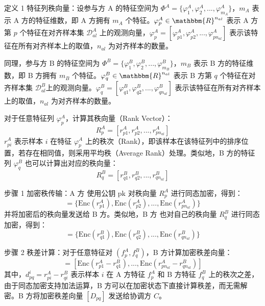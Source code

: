 定义 1 特征列秩向量：设参与方 A 的特征空间为 $ \Phi^A = \{\varphi^A_1, \varphi^A_2, ..., \varphi^A_{m_A}\} $，$ m_A $ 表示 A 方的特征维数，即 A 方拥有 $ m_A $ 个特征。$ \varphi^A_p \in \mathbbm{R}^{n_{al}} $ 表示 A 方第 $ p $ 个特征在对齐样本集 $ \mathcal{D}^A_{al} $ 上的观测向量，$ \varphi^A_p = [\varphi^A_{p1}, \varphi^A_{p2}, ..., \varphi^A_{pn_{al}}] $ 表示该特征在所有对齐样本上的取值，$ n_{al} $ 为对齐样本的数量。

同理，参与方 B 的特征空间为 $ \Phi^B = \{\varphi^B_1, \varphi^B_2, ..., \varphi^B_{m_B}\} $，$ m_B $ 表示 B 方的特征维数，即 B 方拥有 $ m_B $ 个特征。$ \varphi^B_q \in \mathbbm{R}^{n_{al}} $ 表示 B 方第 $ q $ 个特征在对齐样本集 $ \mathcal{D}^B_{al} $上的观测向量。$ \varphi^B_q = [\varphi^B_{q1}, \varphi^B_{q2}, ..., \varphi^B_{qn_{al}}] $ 表示该特征在所有对齐样本上的取值，$ n_{al} $ 为对齐样本的数量。

对于任意特征列 $ \varphi^A_p $，计算其秩向量（Rank Vector）：
\begin{equation}
	R^A_p = [r^A_{p1}, r^A_{p2}, ..., r^A_{pn_{al}}]
\end{equation}
$ r^A_{pi} $ 表示样本 $ i $ 在特征 $ \varphi^A_p $ 上的秩次（Rank），即该样本在该特征列中的排序位置，若存在相同值，则采用平均秩（Average Rank）处理。类似地，B 方的特征列 $ \varphi^B_q $ 也可以计算出对应的秩向量：
\begin{equation}
	R^B_q = [r^B_{q1}, r^B_{q2}, ..., r^B_{qn_{al}}]
\end{equation}

步骤 1 加密秩传输：A 方 使用公钥 $ \text{pk} $ 对秩向量 $ R^A_p $ 进行同态加密，得到：
\begin{equation}
	[R^A_p] = \{\text{Enc}(r^A_{p1}), \text{Enc}(r^A_{p2}), ..., \text{Enc}(r^A_{pn_{al}})\}
\end{equation}
并将加密后的秩向量发送给 B 方。类似地，B 方 也对自己的秩向量 $ R^B_q $ 进行同态加密，得到：
\begin{equation}
	[R^B_q] = \{\text{Enc}(r^B_{q1}), \text{Enc}(r^B_{q2}), ..., \text{Enc}(r^B_{qn_{al}})\}
\end{equation}

步骤 2 秩差计算：对于任意特征对 $ (f^A_p, f^B_q) $，B 方计算加密秩差向量：
\begin{equation}
	[D_{pq}] = \left[ \text{Enc}(r^A_{p1} - r^B_{q1}), ..., \text{Enc}(r^A_{pn_{al}} - r^B_{qn_{al}}) \right]
\end{equation}
其中，$ d_{pq}^i = r^A_{pi} - r^B_{qi} $ 表示样本 $ i $ 在 A 方特征 $ f^A_p $ 和 B 方特征 $ f^B_q $ 上的秩次之差，由于同态加密支持加法运算，B 方可以在加密状态下直接计算秩差，而无需解密。B 方将加密秩差向量 $ [D_{pq}] $ 发送给协调方 $ C $。

